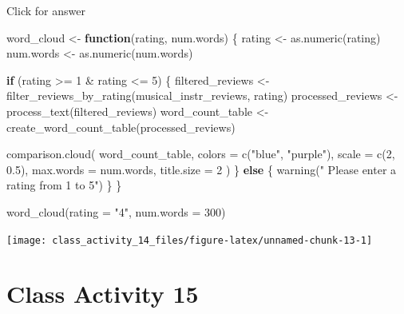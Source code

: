 \documentclass[
]{book}
\newenvironment{Shaded}{\begin{snugshade}}{\end{snugshade}}
\newcommand{\AttributeTok}[1]{\textcolor[rgb]{0.77,0.63,0.00}{#1}}
\newcommand{\ControlFlowTok}[1]{\textcolor[rgb]{0.13,0.29,0.53}{\textbf{#1}}}
\newcommand{\DecValTok}[1]{\textcolor[rgb]{0.00,0.00,0.81}{#1}}
\newcommand{\FloatTok}[1]{\textcolor[rgb]{0.00,0.00,0.81}{#1}}
\newcommand{\FunctionTok}[1]{\textcolor[rgb]{0.00,0.00,0.00}{#1}}
\newcommand{\NormalTok}[1]{#1}
\newcommand{\OtherTok}[1]{\textcolor[rgb]{0.56,0.35,0.01}{#1}}
\newcommand{\SpecialCharTok}[1]{\textcolor[rgb]{0.00,0.00,0.00}{#1}}
\newcommand{\StringTok}[1]{\textcolor[rgb]{0.31,0.60,0.02}{#1}}
\begin{document}
Click for answer

\begin{Shaded}
\begin{Highlighting}[]
\NormalTok{word\_cloud }\OtherTok{\textless{}{-}} \ControlFlowTok{function}\NormalTok{(rating, num.words) \{}
\NormalTok{  rating }\OtherTok{\textless{}{-}} \FunctionTok{as.numeric}\NormalTok{(rating)}
\NormalTok{  num.words }\OtherTok{\textless{}{-}} \FunctionTok{as.numeric}\NormalTok{(num.words)}
  
  \ControlFlowTok{if}\NormalTok{ (rating }\SpecialCharTok{\textgreater{}=} \DecValTok{1} \SpecialCharTok{\&}\NormalTok{ rating }\SpecialCharTok{\textless{}=} \DecValTok{5}\NormalTok{) \{}
\NormalTok{    filtered\_reviews }\OtherTok{\textless{}{-}} \FunctionTok{filter\_reviews\_by\_rating}\NormalTok{(musical\_instr\_reviews, rating)}
\NormalTok{    processed\_reviews }\OtherTok{\textless{}{-}} \FunctionTok{process\_text}\NormalTok{(filtered\_reviews)}
\NormalTok{    word\_count\_table }\OtherTok{\textless{}{-}} \FunctionTok{create\_word\_count\_table}\NormalTok{(processed\_reviews)}
    
    \FunctionTok{comparison.cloud}\NormalTok{(}
\NormalTok{      word\_count\_table,}
      \AttributeTok{colors =} \FunctionTok{c}\NormalTok{(}\StringTok{"blue"}\NormalTok{, }\StringTok{"purple"}\NormalTok{),}
      \AttributeTok{scale =} \FunctionTok{c}\NormalTok{(}\DecValTok{2}\NormalTok{, }\FloatTok{0.5}\NormalTok{),}
      \AttributeTok{max.words =}\NormalTok{ num.words,}
      \AttributeTok{title.size =} \DecValTok{2}
\NormalTok{    )}
\NormalTok{  \} }\ControlFlowTok{else}\NormalTok{ \{}
    \FunctionTok{warning}\NormalTok{(}\StringTok{" Please enter a rating from 1 to 5"}\NormalTok{)}
\NormalTok{  \}}
\NormalTok{\}}

\FunctionTok{word\_cloud}\NormalTok{(}\AttributeTok{rating =} \StringTok{"4"}\NormalTok{, }\AttributeTok{num.words =} \DecValTok{300}\NormalTok{)}
\end{Highlighting}
\end{Shaded}

\texttt{[image: class\_activity\_14\_files/figure-latex/unnamed-chunk-13-1]}

\hypertarget{class-activity-15}{%
\chapter{Class Activity 15}\label{class-activity-15}}
\end{document}

